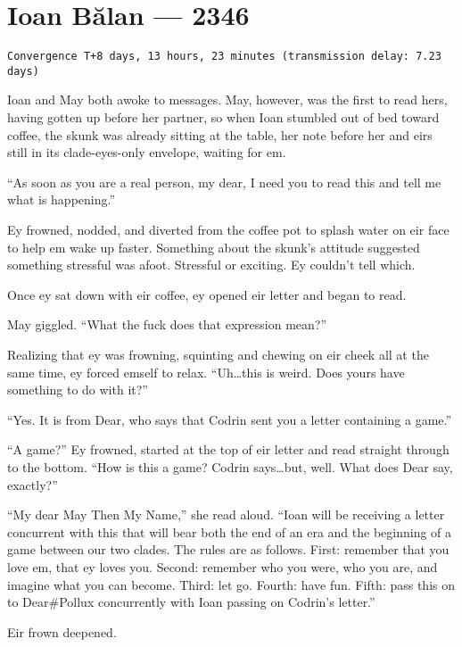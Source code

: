 \hypertarget{ioan-bux103lan-2346}{%
\chapter{Ioan Bălan — 2346}\label{ioan-bux103lan-2346}}

\begin{verbatim}
Convergence T+8 days, 13 hours, 23 minutes (transmission delay: 7.23 days)
\end{verbatim}

Ioan and May both awoke to messages. May, however, was the first to read hers, having gotten up before her partner, so when Ioan stumbled out of bed toward coffee, the skunk was already sitting at the table, her note before her and eirs still in its clade-eyes-only envelope, waiting for em.

``As soon as you are a real person, my dear, I need you to read this and tell me what is happening.''

Ey frowned, nodded, and diverted from the coffee pot to splash water on eir face to help em wake up faster. Something about the skunk's attitude suggested something stressful was afoot. Stressful or exciting. Ey couldn't tell which.

Once ey sat down with eir coffee, ey opened eir letter and began to read.

May giggled. ``What the fuck does that expression mean?''

Realizing that ey was frowning, squinting and chewing on eir cheek all at the same time, ey forced emself to relax. ``Uh\ldots this is weird. Does yours have something to do with it?''

``Yes. It is from Dear, who says that Codrin sent you a letter containing a game.''

``A game?'' Ey frowned, started at the top of eir letter and read straight through to the bottom. ``How is this a game? Codrin says\ldots but, well. What does Dear say, exactly?''

``My dear May Then My Name,'' she read aloud. ``Ioan will be receiving a letter concurrent with this that will bear both the end of an era and the beginning of a game between our two clades. The rules are as follows. First: remember that you love em, that ey loves you. Second: remember who you were, who you are, and imagine what you can become. Third: let go. Fourth: have fun. Fifth: pass this on to Dear\#Pollux concurrently with Ioan passing on Codrin's letter.''

Eir frown deepened.

